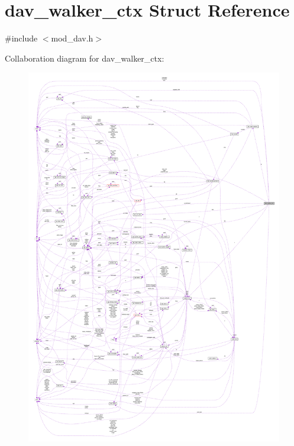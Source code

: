 \hypertarget{structdav__walker__ctx}{}\section{dav\+\_\+walker\+\_\+ctx Struct Reference}
\label{structdav__walker__ctx}


{\ttfamily \#include $<$mod\+\_\+dav.\+h$>$}



Collaboration diagram for dav\+\_\+walker\+\_\+ctx\+:
\nopagebreak
\begin{figure}[H]
\begin{center}
\leavevmode
\includegraphics[width=350pt]{structdav__walker__ctx__coll__graph}
\end{center}
\end{figure}
